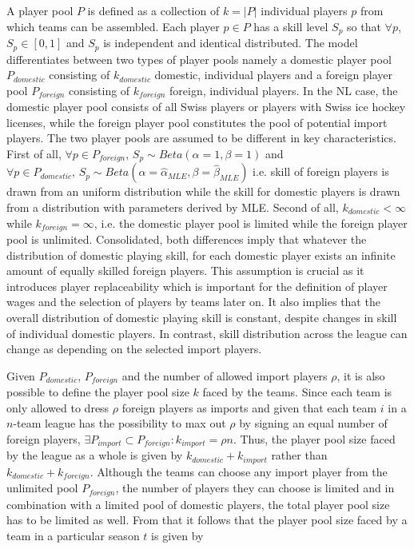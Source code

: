 \documentclass[12pt, a4paper]{article}
\begin{document}
A player pool $P$ is defined as a collection of $k=|P|$ individual players $p$ from which teams can be assembled. Each player $p \in P$ has a skill level $S_p$ so that $\forall p$, $S_p \in [0,1]$ and $S_p$ is independent and identical distributed. The model differentiates between two types of player pools namely a domestic player pool $P_{domestic}$ consisting of $k_{domestic}$ domestic, individual players and a foreign player pool $P_{foreign}$ consisting of $k_{foreign}$ foreign, individual players. In the NL case, the domestic player pool consists of all Swiss players or players with Swiss ice hockey licenses, while the foreign player pool constitutes the pool of potential import players. The two player pools are assumed to be different in key characteristics. First of all, $\forall p \in P_{foreign}, \, S_p \sim Beta(\alpha=1,\beta=1)$ and $\forall p \in P_{domestic}, \, S_p \sim Beta(\alpha=\hat{\alpha}_{MLE},\beta=\hat{\beta}_{MLE})$ i.e. skill of foreign players is drawn from an uniform distribution while the skill for domestic players is drawn from a distribution with parameters derived by MLE. Second of all, $k_{domestic}<\infty$ while $k_{foreign}=\infty$, i.e. the domestic player pool is limited while the foreign player pool is unlimited. Consolidated, both differences imply that whatever the distribution of domestic playing skill, for each domestic player exists an infinite amount of equally skilled foreign players. This assumption is crucial as it introduces player replaceability which is important for the definition of player wages and the selection of players by teams later on. It also implies that the overall distribution of domestic playing skill is constant, despite changes in skill of individual domestic players. In contrast, skill distribution across the league can change as depending on the selected import players. 

\noindent
Given $P_{domestic}$, $P_{foreign}$ and the number of allowed import players $\rho$, it is also possible to define the  player pool size $k$ faced by the teams. Since each team is only allowed to dress $\rho$ foreign players as imports and given that each team $i$ in a $n$-team league has the possibility to max out $\rho$ by signing an equal number of foreign players, $\exists P_{import} \subset P_{foreign} : k_{import}=\rho n$. Thus, the player pool size faced by the league as a whole is given by $k_{domestic}+k_{import}$ rather than $k_{domestic}+k_{foreign}$. Although the teams can choose any import player from the unlimited pool $P_{foreign}$, the number of players they can choose is limited and in combination with a limited pool of domestic players, the total player pool size has to be limited as well. From that it follows that the player pool size faced by a team in a particular season $t$ is given by
\end{document}
